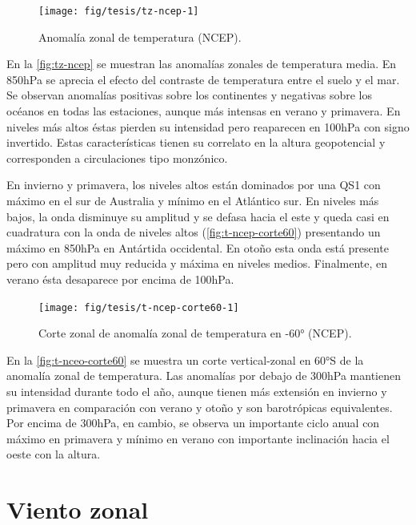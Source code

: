 \documentclass[spanish,a4paper,12pt,oneside]{book}
\begin{document}
\begin{landscape}\begin{figure}

{\centering \texttt{[image: fig/tesis/tz-ncep-1]} 

}

\caption{Anomalía zonal de temperatura (NCEP).}\label{fig:tz-ncep}
\end{figure}
\end{landscape}

En la \autoref{fig:tz-ncep} se muestran las anomalías zonales de
temperatura media. En 850hPa se aprecia el efecto del contraste de
temperatura entre el suelo y el mar. Se observan anomalías positivas
sobre los continentes y negativas sobre los océanos en todas las
estaciones, aunque más intensas en verano y primavera. En niveles más
altos éstas pierden su intensidad pero reaparecen en 100hPa con signo
invertido. Estas características tienen su correlato en la altura
geopotencial y corresponden a circulaciones tipo monzónico.

En invierno y primavera, los niveles altos están dominados por una QS1
con máximo en el sur de Australia y mínimo en el Atlántico sur. En
niveles más bajos, la onda disminuye su amplitud y se defasa hacia el
este y queda casi en cuadratura con la onda de niveles altos
(\autoref{fig:t-ncep-corte60}) presentando un máximo en 850hPa en
Antártida occidental. En otoño esta onda está presente pero con amplitud
muy reducida y máxima en niveles medios. Finalmente, en verano ésta
desaparece por encima de 100hPa.

\begin{figure}
\texttt{[image: fig/tesis/t-ncep-corte60-1]} \caption{Corte zonal de anomalía zonal de temperatura en -60° (NCEP).}\label{fig:t-ncep-corte60}
\end{figure}

En la \autoref{fig:t-nceo-corte60} se muestra un corte vertical-zonal en
60°S de la anomalía zonal de temperatura. Las anomalías por debajo de
300hPa mantienen su intensidad durante todo el año, aunque tienen más
extensión en invierno y primavera en comparación con verano y otoño y
son barotrópicas equivalentes. Por encima de 300hPa, en cambio, se
observa un importante ciclo anual con máximo en primavera y mínimo en
verano con importante inclinación hacia el oeste con la altura.

\section{Viento zonal}\label{viento-zonal}
\end{document}
